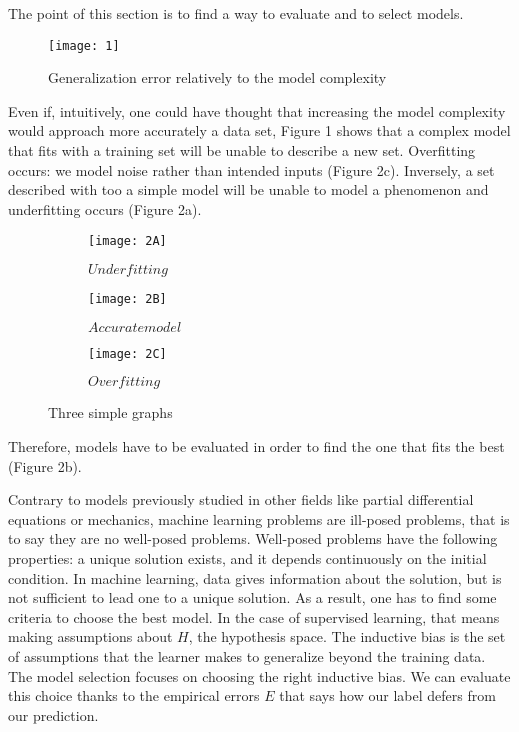 \documentclass[a4paper,12pt]{article}
\begin{document}
The point of this section is to find a way to evaluate and to select models. 
\begin{figure}[!h]
\centering
\texttt{[image: 1]}
\caption{\label{fig:1}Generalization error relatively to the model complexity}
\end{figure}


Even if, intuitively, one could have thought that increasing the model complexity would approach more accurately a data set, Figure 1 shows that a complex model that fits with a training set  will be unable to describe a new  set. Overfitting occurs: we model noise rather than intended inputs (Figure 2c). Inversely, a set described with too a simple model will be unable to model a phenomenon and underfitting occurs (Figure 2a).

\begin{figure}[!h]
    \centering
    \begin{subfigure}[b]{0.3\textwidth}
        \centering
        \texttt{[image: 2A]}
        \caption{$Underfitting$}
    \end{subfigure}
    \begin{subfigure}[b]{0.3\textwidth}
        \centering
        \texttt{[image: 2B]}
        \caption{$Accurate model$}
    \end{subfigure}
    \begin{subfigure}[b]{0.3\textwidth}
        \centering
        \texttt{[image: 2C]}
        \caption{$Overfitting$}
    \end{subfigure}
    \caption{Three simple graphs}
    \label{fig:three graphs}
\end{figure}

Therefore, models have to be evaluated in order to find the one that fits the best (Figure 2b). 

Contrary to models previously studied in other fields like partial differential equations or mechanics, machine learning problems are ill-posed problems, that is to say they are no well-posed problems. Well-posed problems have the following properties: a unique solution exists, and it depends continuously on the initial condition. In machine learning, data gives information about the solution, but is not sufficient to lead one to a unique solution.
As a result, one has to find some criteria to choose the best model. In the case of supervised learning, that means making assumptions about $H$, the hypothesis space. The inductive bias is the set of assumptions that the learner makes to generalize beyond the training data. The model selection focuses on choosing the right inductive bias. We can evaluate this choice thanks to the empirical errors $E$ that says how our label defers from our prediction.
\end{document}
